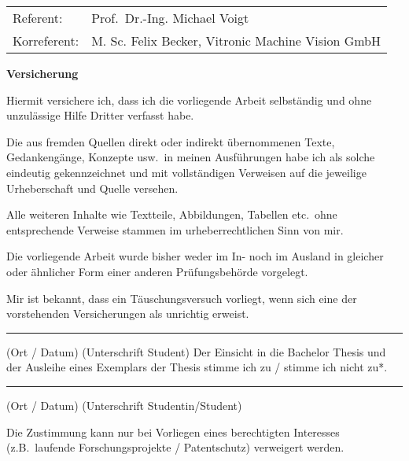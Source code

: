 \vfill
\begin{flushleft}
\begin{tabular}{ll}
    Referent:	 &  Prof.\ Dr.-Ing. Michael Voigt \\ [0.5ex]
    Korreferent:	 &  M. Sc. Felix Becker, Vitronic Machine Vision GmbH
\end{tabular}
\end{flushleft}
\newpage
\thispagestyle{empty}
\rule[0ex]{0ex}{0ex} 	%
\newpage
\thispagestyle{empty} 
%
{\bf Versicherung}
\par
Hiermit versichere ich, dass ich die vorliegende Arbeit selbst\"andig und ohne unzul\"assige Hilfe Dritter verfasst 
habe.
\par
Die aus fremden Quellen direkt oder indirekt \"ubernommenen Texte, Gedankeng\"ange, Konzepte usw.\ in meinen 
Ausf\"uhrungen habe ich als solche eindeutig gekennzeichnet und mit vollst\"andigen Verweisen auf die jeweilige 
Urheberschaft und Quelle versehen.
\par
Alle weiteren Inhalte wie Textteile, Abbildungen, Tabellen etc.\ ohne entsprechende Verweise stammen im 
urheberrechtlichen Sinn von mir.
\par
Die vorliegende Arbeit wurde bisher weder im In- noch im Ausland in gleicher oder \"ahnlicher Form einer anderen 
Pr\"ufungsbeh\"orde vorgelegt.
\par
Mir ist bekannt, dass ein T\"auschungsversuch vorliegt, wenn sich eine der vorstehenden Versicherungen als 
unrichtig erweist.
\par
\vspace{25mm}
\rule[0ex]{\textwidth}{0.4pt}
(Ort / Datum)\hspace{30ex}	(Unterschrift Student)
\newpage
\thispagestyle{empty} 
%
Der Einsicht in die Bachelor Thesis  und der Ausleihe eines Exemplars der Thesis stimme ich zu / stimme ich nicht zu*.
\par\vspace{10mm}
\rule[0ex]{\textwidth}{0.4pt}
(Ort / Datum)\hspace{30ex}	(Unterschrift Studentin/Student)
\par\vspace{10mm}
Die Zustimmung kann nur bei Vorliegen eines berechtigten Interesses (z.B.\ laufende Forschungsprojekte / Patentschutz) 
verweigert werden. 
